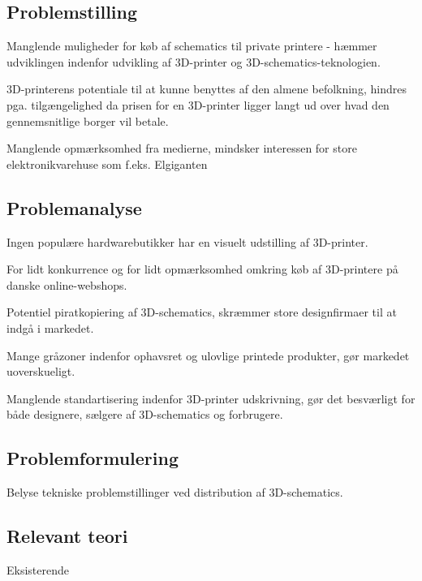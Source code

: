 \subsection{Problemstilling} %
\label{sub:problemstilling}

Manglende muligheder for køb af schematics til private printere - hæmmer udviklingen indenfor udvikling af 3D-printer og 3D-schematics-teknologien.

3D-printerens potentiale til at kunne benyttes af den almene befolkning, hindres pga. tilgængelighed da prisen for en 3D-printer ligger langt ud over hvad den gennemsnitlige borger vil betale.

Manglende opmærksomhed fra medierne, mindsker interessen for store elektronikvarehuse som f.eks. Elgiganten



\subsection{Problemanalyse} %
\label{sub:problemanalyse}

Ingen populære hardwarebutikker har en visuelt udstilling af 3D-printer.

For lidt konkurrence og for lidt opmærksomhed omkring køb af 3D-printere på danske online-webshops.

Potentiel piratkopiering af 3D-schematics, skræmmer store designfirmaer til at indgå i markedet.

Mange gråzoner indenfor ophavsret og ulovlige printede produkter, gør markedet uoverskueligt.

Manglende standartisering indenfor 3D-printer udskrivning, gør det besværligt for både designere, sælgere af 3D-schematics og forbrugere.



\subsection{Problemformulering} %
\label{sub:problemformulering}

Belyse tekniske problemstillinger ved distribution af 3D-schematics.





\subsection{Relevant teori} %
\label{sub:relevant_teori}

Eksisterende


